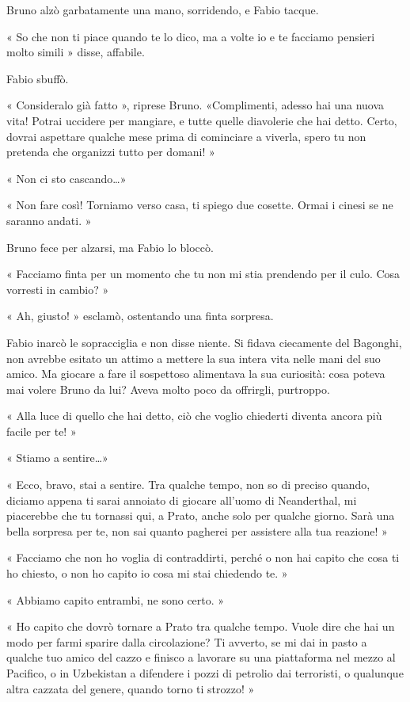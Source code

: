 Bruno alzò garbatamente una mano, sorridendo, e Fabio tacque.

« So che non ti piace quando te lo dico, ma a volte io e te facciamo pensieri molto simili » disse, affabile.

Fabio sbuffò.

« Consideralo già fatto », riprese Bruno. «Complimenti, adesso hai una nuova vita! Potrai uccidere per mangiare, e tutte quelle diavolerie che hai detto. Certo, dovrai aspettare qualche mese prima di cominciare a viverla, spero tu non pretenda che organizzi tutto per domani! »

« Non ci sto cascando\ldots »

« Non fare così! Torniamo verso casa, ti spiego due cosette. Ormai i cinesi se ne saranno andati. »

Bruno fece per alzarsi, ma Fabio lo bloccò.

« Facciamo finta per un momento che tu non mi stia prendendo per il culo. Cosa vorresti in cambio? »

« Ah, giusto! » esclamò, ostentando una finta sorpresa.

Fabio inarcò le sopracciglia e  non disse niente. Si fidava ciecamente del Bagonghi, non avrebbe esitato un attimo a mettere la sua intera vita nelle mani del suo amico. Ma giocare a fare il sospettoso alimentava la sua curiosità: cosa poteva mai volere Bruno da lui? Aveva molto poco da offrirgli, purtroppo.

« Alla luce di quello che hai detto, ciò che voglio chiederti diventa ancora più facile per te! »

« Stiamo a sentire\ldots »

« Ecco, bravo, stai a sentire. Tra qualche tempo, non so di preciso quando, diciamo appena ti sarai annoiato di giocare all'uomo di Neanderthal, mi piacerebbe che tu tornassi qui, a Prato, anche solo per qualche giorno. Sarà una bella sorpresa per te, non sai quanto pagherei per assistere alla tua reazione! »

« Facciamo che non ho voglia di contraddirti, perché o non hai capito che cosa ti ho chiesto, o non ho capito io cosa mi stai chiedendo te. »

« Abbiamo capito entrambi, ne sono certo. »

« Ho capito che dovrò tornare a Prato tra qualche tempo. Vuole dire che hai un modo per farmi sparire dalla circolazione? Ti avverto, se mi dai in pasto a qualche tuo amico del cazzo e finisco a lavorare su una piattaforma nel mezzo al Pacifico, o in Uzbekistan a difendere i pozzi di petrolio dai terroristi, o qualunque altra cazzata del genere, quando torno ti strozzo! »

